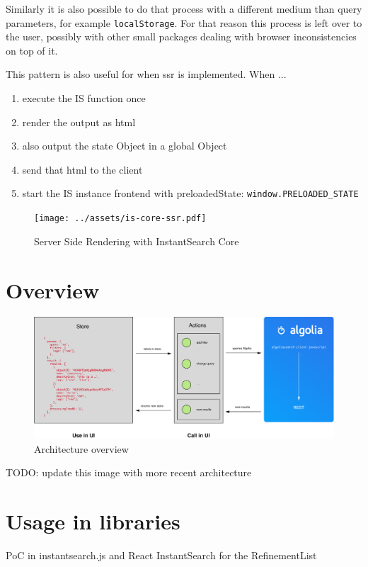 Similarly it is also possible to do that process with a different medium than query parameters, for example {\tt localStorage}. For that reason this process is left over to the user, possibly with other small packages dealing with browser inconsistencies on top of it. 

This pattern is also useful for when \acrfull{ssr} is implemented. When ...%

\begin{enumerate}
  \item execute the IS function once
  \item render the output as html
  \item also output the state Object in a global Object
  \item send that html to the client
  \item start the IS instance frontend with preloadedState: {\tt window.PRELOADED\_STATE} %
\end{enumerate}

\begin{figure}[H]
  \centering
  \texttt{[image: ../assets/is-core-ssr.pdf]}
  \caption{Server Side Rendering with InstantSearch Core}
  \label{figure:is-core-ssr}
\end{figure} %


\section{Overview} %
\label{sec:overview}

\begin{figure}[H]
  \centering
  \includegraphics[width=\textwidth]{../assets/architecture.pdf}
  \caption{Architecture overview\cite{blog-architecture}}
  \label{figure:core-architecture}
\end{figure}

TODO: update this image with more recent architecture %


\section{Usage in libraries} %
\label{sec:usage_in_libraries}

PoC in instantsearch.js and React InstantSearch for the RefinementList %

